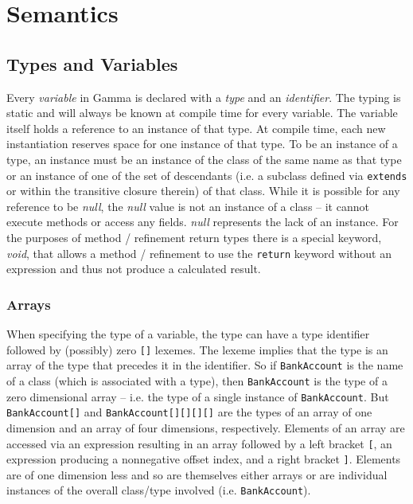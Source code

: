 \section{Semantics}

\subsection{Types and Variables}
Every \textit{variable} in Gamma is declared with a \textit{type} and an \textit{identifier}. The typing is static and will always be known at compile time for every variable. The variable itself holds a reference to an instance of that type. At compile time, each new instantiation reserves space for one instance of that type. To be an instance of a type, an instance must be an instance of the class of the same name as that type or an instance of one of the set of descendants (i.e. a subclass defined via \verb!extends! or within the transitive closure therein) of that class. While it is possible for any reference to be \textit{null}, the \textit{null} value is not an instance of a class -- it cannot execute methods or access any fields. \textit{null} represents the lack of an instance. For the purposes of method / refinement return types there is a special keyword, \textit{void}, that allows a method / refinement to use the \verb!return! keyword without an expression and thus not produce a calculated result.

\subsubsection{Arrays}
When specifying the type of a variable, the type can have a type identifier followed by (possibly) zero \verb![]! lexemes. The lexeme implies that the type is an array of the type that precedes it in the identifier. So if \verb!BankAccount! is the name of a class (which is associated with a type), then \verb!BankAccount! is the type of a zero dimensional array -- i.e. the type of a single instance of \verb!BankAccount!. But \verb!BankAccount[]! and \verb!BankAccount[][][][]! are the types of an array of one dimension and an array of four dimensions, respectively. Elements of an array are accessed via an expression resulting in an array followed by a left bracket \verb![!, an expression producing a nonnegative offset index, and a right bracket \verb!]!. Elements are of one dimension less and so are themselves either arrays or are individual instances of the overall class/type involved (i.e. \verb!BankAccount!).


